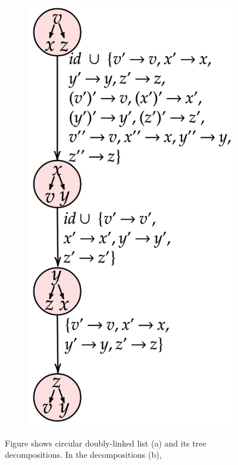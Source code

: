 {\begin{figure}[t]
\begin{center}
\begin{subfigure}[b]{0.33\linewidth}
		  \includegraphics[scale=0.15]{figs/netys/decomp3.png}
                \end{subfigure}
\caption{Figure shows circular doubly-linked list (a) and its tree decompositions. In the decompositions (b),
}
\end{center}
\end{figure}}
